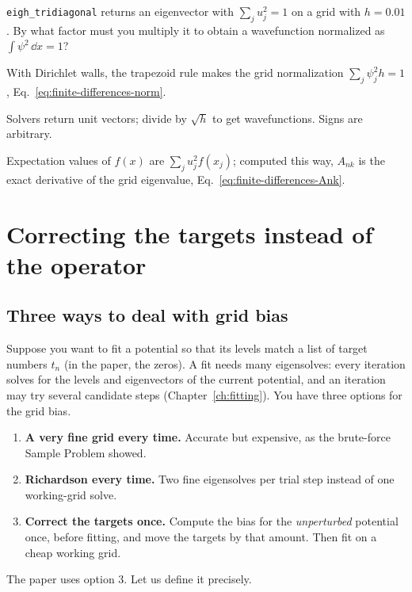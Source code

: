 \begin{checkpoint}
\texttt{eigh\_tridiagonal} returns an eigenvector with $\sum_ju_j^2=1$ on a grid with $h=0.01$. By what factor must you multiply it to obtain a wavefunction normalized as $\int\psi^2\,\dd x=1$?
\end{checkpoint}

\begin{keyideas}
\item With Dirichlet walls, the trapezoid rule makes the grid normalization $\sum_j\psi_j^2h=1$, Eq.~\eqref{eq:finite-differences-norm}.
\item Solvers return unit vectors; divide by $\sqrt h$ to get wavefunctions. Signs are arbitrary.
\item Expectation values of $f(x)$ are $\sum_ju_j^2f(x_j)$; computed this way, $A_{nk}$ is the exact derivative of the grid eigenvalue, Eq.~\eqref{eq:finite-differences-Ank}.
\end{keyideas}

\section{Correcting the targets instead of the operator}\label{sec:finite-differences-targets}

\subsection{Three ways to deal with grid bias}

Suppose you want to fit a potential so that its levels match a list of target numbers $t_n$ (in the paper, the zeros). A fit needs many eigensolves: every iteration solves for the levels and eigenvectors of the current potential, and an iteration may try several candidate steps (Chapter~\ref{ch:fitting}). You have three options for the grid bias.
\begin{enumerate}
\item \textbf{A very fine grid every time.} Accurate but expensive, as the brute-force Sample Problem showed.
\item \textbf{Richardson every time.} Two fine eigensolves per trial step instead of one working-grid solve.
\item \textbf{Correct the targets once.} Compute the bias for the \emph{unperturbed} potential once, before fitting, and move the targets by that amount. Then fit on a cheap working grid.
\end{enumerate}
The paper uses option 3. Let us define it precisely.

